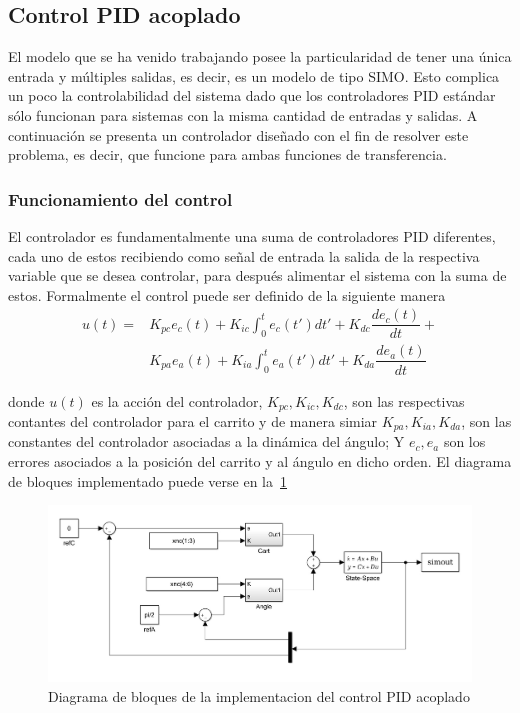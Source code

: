 \subsection{Control PID acoplado}
El modelo que se ha venido trabajando posee la particularidad de tener una única entrada
y múltiples salidas, es decir, es un modelo de tipo SIMO. Esto complica un poco la
controlabilidad del sistema dado que los controladores PID estándar sólo funcionan para sistemas con la misma cantidad de entradas y salidas.
A continuación se presenta un controlador diseñado con el fin de resolver este
problema, es decir, que funcione para ambas funciones de transferencia.
\subsubsection{Funcionamiento del control}
El controlador es fundamentalmente una suma de controladores PID diferentes,
cada uno de estos recibiendo como señal de entrada la salida de la respectiva
variable que se desea controlar, para después alimentar el sistema con la suma de estos.
Formalmente el control puede ser definido de la siguiente manera
\begin{align*}
  u(t) =& K_{pc}e_c(t) + K_{ic}\int_0^te_c(t')dt' + K_{dc}\dfrac{de_{c}(t)}{dt} + \\
   & K_{pa}e_a(t) + K_{ia}\int_0^te_a(t')dt' + K_{da}\dfrac{de_{a}(t)}{dt}  
\end{align*}

donde $u(t)$ es la acción del controlador, $K_{pc}, K_{ic}, K_{dc}$, son las respectivas
contantes del controlador para el carrito y de manera simiar $K_{pa}, K_{ia}, K_{da}$,
son las constantes del controlador asociadas a la dinámica del ángulo; Y $e_c, e_a$ son los errores asociados a la posición del carrito y al ángulo en dicho orden.
El diagrama de bloques implementado puede verse en la~\ref{fig:controlS}

\begin{figure}[t]
  \label{fig:controlS}
  \includegraphics[scale=0.2]{Figuras/control-modelo.jpg}
  \caption{Diagrama de bloques de la implementacion del control PID acoplado} 
\end{figure}

